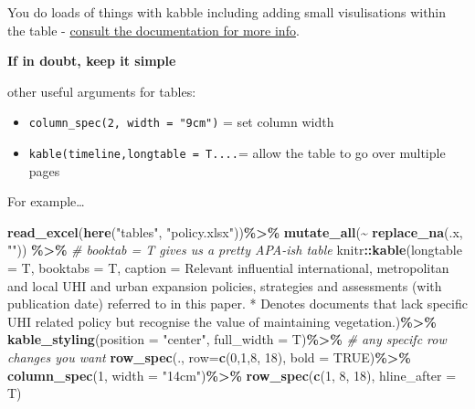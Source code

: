 \documentclass[
  12pt,
  oneside]{book}
\newenvironment{Shaded}{\begin{snugshade}}{\end{snugshade}}
\newcommand{\AttributeTok}[1]{\textcolor[rgb]{0.13,0.29,0.53}{#1}}
\newcommand{\CommentTok}[1]{\textcolor[rgb]{0.56,0.35,0.01}{\textit{#1}}}
\newcommand{\ConstantTok}[1]{\textcolor[rgb]{0.56,0.35,0.01}{#1}}
\newcommand{\DecValTok}[1]{\textcolor[rgb]{0.00,0.00,0.81}{#1}}
\newcommand{\FunctionTok}[1]{\textcolor[rgb]{0.13,0.29,0.53}{\textbf{#1}}}
\newcommand{\NormalTok}[1]{#1}
\newcommand{\SpecialCharTok}[1]{\textcolor[rgb]{0.81,0.36,0.00}{\textbf{#1}}}
\newcommand{\StringTok}[1]{\textcolor[rgb]{0.31,0.60,0.02}{#1}}
\begin{document}
You do loads of things with kabble including adding small visulisations within the table - \href{https://cran.r-project.org/web/packages/kableExtra/vignettes/awesome_table_in_html.html\#Overview}{consult the documentation for more info}.

\textbf{If in doubt, keep it simple}

other useful arguments for tables:

\begin{itemize}
\item
  \texttt{column\_spec(2,\ width\ =\ "9cm")} = set column width
\item
  \texttt{kable(timeline,longtable\ =\ T....}= allow the table to go over multiple pages
\end{itemize}

For example\ldots{}
\newpage

\begin{Shaded}
\begin{Highlighting}[]
\FunctionTok{read\_excel}\NormalTok{(}\FunctionTok{here}\NormalTok{(}\StringTok{"tables"}\NormalTok{, }\StringTok{"policy.xlsx"}\NormalTok{))}\SpecialCharTok{\%\textgreater{}\%}
  \FunctionTok{mutate\_all}\NormalTok{(}\SpecialCharTok{\textasciitilde{}} \FunctionTok{replace\_na}\NormalTok{(.x, }\StringTok{""}\NormalTok{)) }\SpecialCharTok{\%\textgreater{}\%}
  \CommentTok{\# booktab = T gives us a pretty APA{-}ish table}
\NormalTok{  knitr}\SpecialCharTok{::}\FunctionTok{kable}\NormalTok{(}\AttributeTok{longtable =}\NormalTok{ T, }\AttributeTok{booktabs =}\NormalTok{ T, }
               \AttributeTok{caption =} \StringTok{\textquotesingle{}Relevant influential international, metropolitan and local UHI and urban expansion policies, strategies and assessments (with publication date) referred to in this paper. * Denotes documents that lack specific UHI related policy but recognise the value of maintaining vegetation.\textquotesingle{}}\NormalTok{)}\SpecialCharTok{\%\textgreater{}\%} 
  \FunctionTok{kable\_styling}\NormalTok{(}\AttributeTok{position =} \StringTok{"center"}\NormalTok{, }\AttributeTok{full\_width =}\NormalTok{ T)}\SpecialCharTok{\%\textgreater{}\%}
  \CommentTok{\# any specifc row changes you want}
    \FunctionTok{row\_spec}\NormalTok{(.,}
  \AttributeTok{row=}\FunctionTok{c}\NormalTok{(}\DecValTok{0}\NormalTok{,}\DecValTok{1}\NormalTok{,}\DecValTok{8}\NormalTok{, }\DecValTok{18}\NormalTok{),}
  \AttributeTok{bold =} \ConstantTok{TRUE}\NormalTok{)}\SpecialCharTok{\%\textgreater{}\%}
  \FunctionTok{column\_spec}\NormalTok{(}\DecValTok{1}\NormalTok{, }\AttributeTok{width =} \StringTok{"14cm"}\NormalTok{)}\SpecialCharTok{\%\textgreater{}\%}
  \FunctionTok{row\_spec}\NormalTok{(}\FunctionTok{c}\NormalTok{(}\DecValTok{1}\NormalTok{, }\DecValTok{8}\NormalTok{, }\DecValTok{18}\NormalTok{), }\AttributeTok{hline\_after =}\NormalTok{ T)}
\end{Highlighting}
\end{Shaded}
\end{document}
